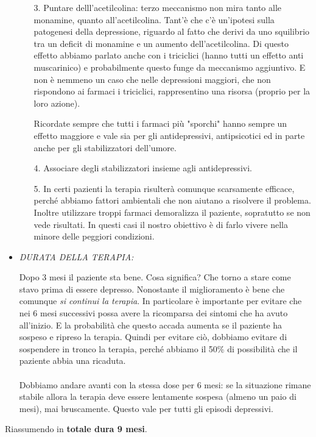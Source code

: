 \begin{itemize}
\begin{itemize}
\item[3.]
  Puntare delll'acetilcolina: terzo meccanismo non mira tanto alle
  monamine, quanto all'acetilcolina. Tant'è che c'è un'ipotesi sulla
  patogenesi della depressione, riguardo al fatto che derivi da uno
  squilibrio tra un deficit di monamine e un aumento dell'acetilcolina.
  Di questo effetto abbiamo parlato anche con i triciclici (hanno tutti
  un effetto anti muscarinico) e probabilmente questo funge da
  meccanismo aggiuntivo. E non è nemmeno un caso che nelle depressioni
  maggiori, che non rispondono ai farmaci i triciclici, rappresentino
  una risorsa (proprio per la loro azione).

Ricordate sempre che tutti i farmaci più "sporchi" hanno sempre un
effetto maggiore e vale sia per gli antidepressivi, antipsicotici ed in
parte anche per gli stabilizzatori dell'umore.

\item[4.]
  Associare degli stabilizzatori insieme agli antidepressivi.
\item[5.]
  In certi pazienti la terapia risulterà comunque scarsamente efficace,
  perché abbiamo fattori ambientali che non aiutano a risolvere il
  problema. Inoltre utilizzare troppi farmaci demoralizza il paziente,
  sopratutto se non vede risultati. In questi casi il nostro obiettivo è
  di farlo vivere nella minore delle peggiori condizioni.
\end{itemize}

\item
  \emph{DURATA DELLA TERAPIA:}

Dopo 3 mesi il paziente sta bene. Cosa significa? Che torno a stare come
stavo prima di essere depresso. Nonostante il miglioramento è bene che
comunque \emph{si continui la terapia}. In particolare è importante per
evitare che nei 6 mesi successivi possa avere la ricomparsa dei sintomi
che ha avuto all'inizio. E la probabilità che questo accada aumenta se
il paziente ha sospeso e ripreso la terapia. Quindi per evitare ciò,
dobbiamo evitare di sospendere in tronco la terapia, perché abbiamo il
50\% di possibilità che il paziente abbia una ricaduta.
\\\\
Dobbiamo andare avanti con la stessa dose per 6 mesi: se la situazione
rimane stabile allora la terapia deve essere lentamente sospesa (almeno
un paio di mesi), mai bruscamente. Questo vale per tutti gli episodi
depressivi.
\end{itemize}

Riassumendo in \textbf{totale dura 9 mesi}.

